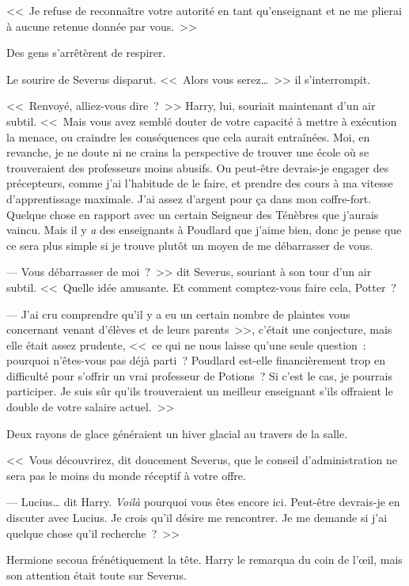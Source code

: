 <<~Je refuse de reconnaître votre autorité en tant qu'enseignant et ne me plierai à aucune retenue donnée par vous.~>>

Des gens s'arrêtèrent de respirer.

Le sourire de Severus disparut. <<~Alors vous serez…~>> il s'interrompit.

<<~Renvoyé, alliez-vous dire~?~>> Harry, lui, souriait maintenant d'un air subtil. <<~Mais vous avez semblé douter de votre capacité à mettre à exécution la menace, ou craindre les conséquences que cela aurait entraînées. Moi, en revanche, je ne doute ni ne crains la perspective de trouver une école où se trouveraient des professeurs moins abusifs. Ou peut-être devrais-je engager des précepteurs, comme j'ai l'habitude de le faire, et prendre des cours à ma vitesse d'apprentissage maximale. J'ai assez d'argent pour ça dans mon coffre-fort. Quelque chose en rapport avec un certain Seigneur des Ténèbres que j'aurais vaincu. Mais il y \emph{a} des enseignants à Poudlard que j'aime bien, donc je pense que ce sera plus simple si je trouve plutôt un moyen de me débarrasser de vous.

--- Vous débarrasser de moi~?~>> dit Severus, souriant à son tour d'un air subtil. <<~Quelle idée amusante. Et comment comptez-vous faire cela, Potter~?

--- J'ai cru comprendre qu'il y a eu un certain nombre de plaintes vous concernant venant d'élèves et de leurs parents~>>, c'était une conjecture, mais elle était assez prudente, <<~ce qui ne nous laisse qu'une seule question~: pourquoi n'êtes-vous pas déjà parti~? Poudlard est-elle financièrement trop en difficulté pour s'offrir un vrai professeur de Potions~? Si c'est le cas, je pourrais participer. Je suis sûr qu'ils trouveraient un meilleur enseignant s'ils offraient le double de votre salaire actuel.~>>

Deux rayons de glace généraient un hiver glacial au travers de la salle.

<<~Vous découvrirez, dit doucement Severus, que le conseil d'administration ne sera pas le moins du monde réceptif à votre offre.

--- Lucius… dit Harry. \emph{Voilà} pourquoi vous êtes encore ici. Peut-être devrais-je en discuter avec Lucius. Je crois qu'il désire me rencontrer. Je me demande si j'ai quelque chose qu'il recherche~?~>>

Hermione secoua frénétiquement la tête. Harry le remarqua du coin de l'œil, mais son attention était toute sur Severus.

